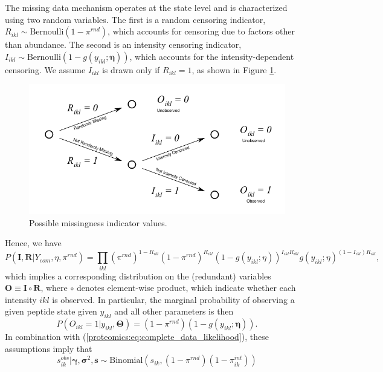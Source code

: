 The missing data mechanism operates at the state level and is characterized using two random variables.
The first is a random censoring indicator, $R_{ikl} \sim \text{Bernoulli}(1 - \pi^{rnd})$, which accounts for censoring due to factors other than abundance.
The second is an intensity censoring indicator, $I_{ikl} \sim \text{Bernoulli}(1 - g(y_{ikl}; \bm \eta))$, which accounts for the intensity-dependent censoring.
We assume $I_{ikl}$ is drawn only if $R_{ikl} = 1$, as shown in Figure \ref{proteomics:fig:Missing_Data_Indicators_Tree}.
%
\ifx\nofigures\undefined
\begin{figure}[ht!]
\begin{center}
\includegraphics[width=.75\textwidth]{figures/proteomics/fig_tree_awb.pdf}
\end{center}
\caption{Possible missingness indicator values.\label{proteomics:fig:Missing_Data_Indicators_Tree}}
\end{figure}
\fi
%
Hence, we have
\begin{equation}
P(\bm I, \bm R | Y_{com}, \eta, \pi^{rnd}) =
\prod_{ikl} (\pi^{rnd})^{1 - R_{ikl}}
(1 - \pi^{rnd})^{R_{ikl}}
(1 - g(y_{ikl}; \eta))^{I_{ikl} R_{ikl}}
g(y_{ikl}; \eta)^{(1 - I_{ikl}) R_{ikl}},
\end{equation}
%
which implies a corresponding distribution on the (redundant) variables $\bm O \equiv \bm I \circ \bm R$, where $\circ$ denotes element-wise product, which indicate whether each intensity $ikl$ is observed.
In particular, the marginal probability of observing a given peptide state given $y_{ikl}$ and all other parameters is then
%
\begin{equation}
P(O_{ikl} = 1 | y_{ikl}, \bm \Theta) = (1 - \pi^{rnd}) (1 - g(y_{ikl}; \bm \eta)).
\end{equation}
%
In combination with (\ref{proteomics:eq:complete_data_likelihood}), these assumptions imply that
\begin{equation}
s_{ik}^{obs} | \bm \gamma, \bm \sigma^2, \bm s \sim \text{Binomial}(s_{ik}, (1-\pi^{rnd})(1 - \pi^{int}_{ik}))
\end{equation}
